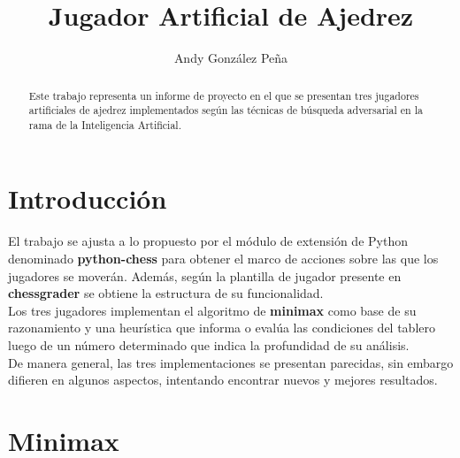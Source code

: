 \documentclass{llncs}
\begin{document}
\title{Jugador Artificial de Ajedrez}

\author{Andy Gonz\'alez Pe\~na}

\maketitle

\begin{multicols}{2}[]

\begin{abstract}

Este trabajo representa un informe de proyecto en el que se presentan tres jugadores artificiales de ajedrez implementados
seg\'un las t\'ecnicas de b\'usqueda adversarial en la rama de la Inteligencia Artificial.

\end{abstract}

\section{Introducci\'on}\label{sec:Introduction}

El trabajo se ajusta a lo propuesto por el m\'odulo de extensi\'on de Python denominado \textbf{python-chess} para obtener
el marco de acciones sobre las que los jugadores se mover\'an. Adem\'as, seg\'un la plantilla de jugador presente en \textbf{chessgrader}
se obtiene la estructura de su funcionalidad.\\
Los tres jugadores implementan el algoritmo de \textbf{minimax} como base de su razonamiento y una heur\'istica que informa o eval\'ua
las condiciones del tablero luego de un n\'umero determinado que indica la profundidad de su an\'alisis.\\
De manera general, las tres implementaciones se presentan parecidas, sin embargo difieren en algunos aspectos, intentando encontrar
nuevos y mejores resultados.

\section{Minimax}\label{sec:Minimax}


\end{multicols}
\end{document}
